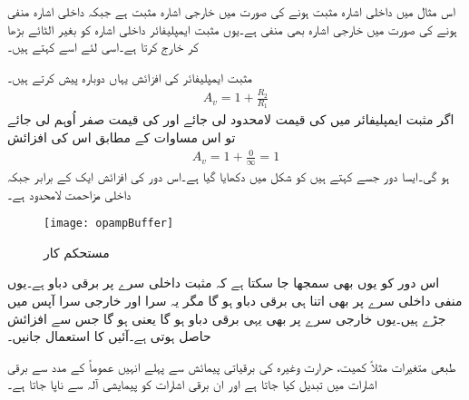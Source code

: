 
	اس مثال میں داخلی اشارہ مثبت ہونے کی صورت میں خارجی اشارہ  مثبت ہے جبکہ داخلی اشارہ منفی ہونے کی صورت میں خارجی اشارہ بھی منفی ہے۔یوں مثبت ایمپلیفائر داخلی اشارہ کو بغیر الٹائے بڑھا کر خارج کرتا ہے۔اسی لئے اسے   کہتے ہیں۔


	مثبت ایمپلیفائر کی افزائش یہاں دوبارہ پیش کرتے ہیں۔
\begin{align}
A_v=1+\frac{R_2}{R_1}
\end{align}
اگر مثبت ایمپلیفائر میں  کی قیمت لامحدود لی جائے اور  کی قیمت صفر اُوہم  لی جائے تو اس مساوات کے مطابق اس کی افزائش
\begin{align}
A_v=1+\frac{0}{\infty} =1
\end{align}
ہو گی۔ایسا دور جسے   کہتے ہیں کو شکل  میں دکھایا گیا ہے۔اس دور کی افزائش ایک کے برابر جبکہ داخلی مزاحمت لامحدود ہے۔
\begin{figure}
\centering
\texttt{[image: opampBuffer]}
\caption{مستحکم کار}
\label{شکل_وسطی_دور}
\end{figure}
اس دور کو یوں بھی سمجھا جا سکتا ہے کہ مثبت داخلی سرے پر برقی دباو  ہے۔یوں منفی داخلی سرے پر  بھی اتنا ہی برقی دباو ہو گا مگر یہ سرا اور خارجی سرا آپس میں جڑے ہیں۔یوں خارجی سرے پر بھی یہی برقی دباو ہو گا یعنی  ہو گا جس سے افزائش  حاصل ہوتی ہے۔آئیں  کا استعمال جانیں۔ 

طبعی متغیرات مثلاً  کمیت، حرارت وغیرہ  کی برقیاتی پیمائش سے پہلے انہیں عموماً    کے مدد سے برقی اشارات میں تبدیل کیا جاتا ہے اور ان برقی اشارات کو پیمایشی آلہ  سے ناپا جاتا ہے۔

